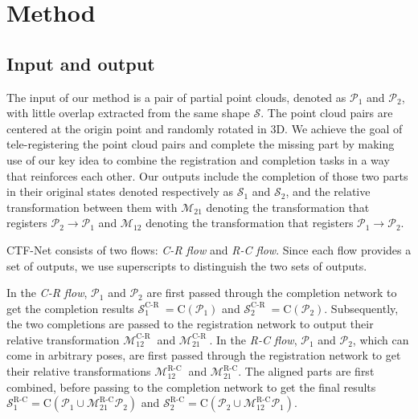 


\section{Method} \label{sec:method}


\subsection{Input and output}
The input of our method is a pair of partial point clouds, denoted as $\mathcal{P}_1$ and $\mathcal{P}_2$,  with little overlap  extracted from the same shape $\mathcal{S}$.  The point cloud pairs are centered at the origin point and randomly rotated in 3D. We achieve the goal of tele-registering the point cloud pairs and complete the missing part by making use of our key idea to combine the registration and completion tasks in a way that reinforces each other.
Our outputs include the completion of those two parts in their original states denoted respectively as $\mathcal{S}_1$ and $\mathcal{S}_2$, and the relative transformation between them with $\mathcal{M}_{21}$ denoting the transformation that registers $\mathcal{P}_2 \rightarrow \mathcal{P}_1$ and $\mathcal{M}_{12}$ denoting the transformation that registers $\mathcal{P}_1 \rightarrow \mathcal{P}_2$. 

CTF-Net consists of two flows: \textit{C-R flow} and \textit{R-C flow}. Since each flow provides a set of outputs, we use superscripts to distinguish the two sets of outputs. 

In the \textit{C-R flow},  $\mathcal{P}_1$ and $\mathcal{P}_2$ are first passed through the completion network to get the completion results $\mathcal{S}_1^{\text{C-R }} = \text{C}(\mathcal{P}_1)$ and  $\mathcal{S}_2^{\text{C-R }} = \text{C}(\mathcal{P}_2)$. Subsequently, the two completions are passed to the registration network to output their relative transformation $\mathcal{M}_{12}^{\text{C-R }}$ and $\mathcal{M}_{21}^{\text{C-R }}$. 
In the \textit{R-C flow}, $\mathcal{P}_1$ and $\mathcal{P}_2$, which can come in arbitrary poses, are first passed through the registration network to get their relative transformations $\mathcal{M}_{12}^{\text{R-C }}$ and $\mathcal{M}_{21}^{\text{R-C}}$. The aligned parts are first combined, before passing to the completion network to get the final results $\mathcal{S}_1^{\text{R-C}} = \text{C}(\mathcal{P}_1 \cup \mathcal{M}_{21}^{\text{R-C}} \mathcal{P}_2)$ and $\mathcal{S}_2^{\text{R-C}} = \text{C}(\mathcal{P}_2 \cup \mathcal{M}_{12}^{\text{R-C}} \mathcal{P}_1)$.
	
